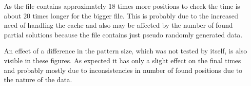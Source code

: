As the file contains approximately 18 times more positions to check the time is about 20 times longer for the bigger file. This is probably due to the increased need of handling the cache and also may be affected by the number of found partial solutions because the file contains just pseudo randomly generated data.

An effect of a difference in the pattern size, which was not tested by itself, is also visible in these figures. As expected it has only a slight effect on the final times and probably mostly due to inconsistencies in number of found positions due to the nature of the data.

\begin{figure}
\begin{minipage}{\linewidth}
\centering
{}
\end{minipage}\par\medskip

\begin{minipage}{.5\linewidth}
\centering
{}
\end{minipage}%
\begin{minipage}{.5\linewidth}
\centering
{}
\end{minipage}\par\medskip


\end{figure}
